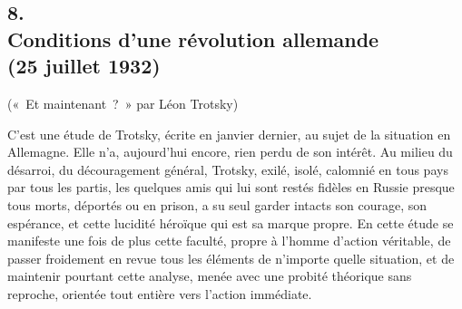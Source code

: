 \documentclass[french,twoside]{book} %
\newenvironment{quoteblock}%
  {\begin{quoting}}
  {\end{quoting}}
\newenvironment{quotebar}{%
    \def\FrameCommand{{\color{rubric!10!}\vrule width 0.5em} \hspace{0.9em}}%
    \def\OuterFrameSep{\itemsep} %
    \MakeFramed {\advance\hsize-\width \FrameRestore}
  }%
  {%
    \endMakeFramed
  }
\renewenvironment{quoteblock}%
  {%
    \savenotes
    \setstretch{0.9}
    \normalfont
    \begin{quotebar}
  }
  {%
    \end{quotebar}
    \spewnotes
  }
\begin{document}
\subsection[{8. Conditions d'une révolution allemande, (25 juillet 1932)}]{8. \\
Conditions d'une révolution allemande \\
(25 juillet 1932)}
\noindent \par

\begin{quoteblock}
 \noindent (« Et maintenant ? » par Léon Trotsky)
 \end{quoteblock}

\noindent C'est une étude de Trotsky, écrite en janvier dernier, au sujet de la situa­tion en Allemagne. Elle n'a, aujourd'hui encore, rien perdu de son intérêt. Au milieu du désarroi, du découragement général, Trotsky, exilé, isolé, calomnié en tous pays par tous les partis, les quelques amis qui lui sont restés fidèles en Russie presque tous morts, déportés ou en prison, a su seul garder intacts son courage, son espérance, et cette lucidité héroïque qui est sa marque propre. En cette étude se manifeste une fois de plus cette faculté, propre à l'homme d'action véritable, de passer froidement en revue tous les éléments de n'im­porte quelle situation, et de maintenir pourtant cette analyse, menée avec une probité théorique sans reproche, orientée tout entière vers l'action immédiate.\par
\end{document}
